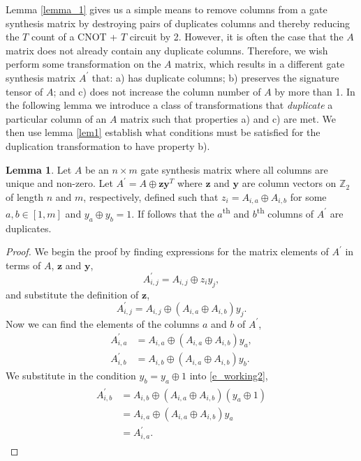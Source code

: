 \documentclass[notitlepage]{article}
\theoremstyle{definition}
\theoremstyle{problem}
\theoremstyle{lemma}
\newtheorem{lemma}{Lemma}[section]
\begin{document}
Lemma \ref{lemma_1} gives us a simple means to remove columns from a gate synthesis matrix by destroying pairs of duplicates columns and thereby reducing the $T$ count of a CNOT + $T$ circuit by 2. However, it is often the case that the $A$ matrix does not already contain any duplicate columns. Therefore, we wish perform some transformation on the $A$ matrix, which results in a different gate synthesis matrix $A^\prime$ that: a) has duplicate columns; b) preserves the signature tensor of $A$; and c) does not increase the column number of $A$ by more than 1. In the following lemma we introduce a class of transformations that \emph{duplicate} a particular column of an $A$ matrix such that properties a) and c) are met. We then use lemma \ref{lem1} establish what conditions must be satisfied for the duplication transformation to have property b).

\theoremstyle{lemma}
\begin{lemma}{}
	\label{lem2}
	Let $A$ be an $n\times m$ gate synthesis matrix where all columns are unique and non-zero. Let $A^\prime = A \oplus \mathbf{z}\mathbf{y}^T$ where $\mathbf{z}$ and $\mathbf{y}$ are column vectors on $\mathbb{Z}_2$ of length $n$ and $m$, respectively, defined such that $z_i = A_{i,a} \oplus A_{i,b}$ for some $a,b\in \left[1,m\right]$ and $y_a \oplus y_b = 1$. If follows that the $a$\textsuperscript{th} and $b$\textsuperscript{th} columns of $A^\prime$ are duplicates.
\end{lemma}
\begin{proof}
	We begin the proof by finding expressions for the matrix elements of $A^\prime$ in terms of $A$, $\mathbf{z}$ and $\mathbf{y}$,
	\begin{equation}
	A^\prime_{i,j} = A_{i,j} \oplus z_i y_j,
	\end{equation}
	and substitute the definition of $\mathbf{z}$,
	\begin{equation}
	A^\prime_{i,j} = A_{i,j} \oplus (A_{i,a}\oplus A_{i,b}) y_j.
	\end{equation}
	Now we can find the elements of the columns $a$ and $b$ of $A^\prime$,
	\begin{align}
	A^\prime_{i,a} &= A_{i,a} \oplus (A_{i,a}\oplus A_{i,b}) y_a,\\
	A^\prime_{i,b} &= A_{i,b} \oplus (A_{i,a}\oplus A_{i,b}) y_b.
	\label{e_working2}
	\end{align}
	We substitute in the condition $y_b = y_a \oplus 1$ into \ref{e_working2},
	\begin{align}
	\begin{split}
	A^\prime_{i,b} &= A_{i,b} \oplus (A_{i,a}\oplus A_{i,b}) (y_a \oplus 1) \\
	&= A_{i,a} \oplus (A_{i,a}\oplus A_{i,b})y_a \\
	& = A^\prime_{i,a}.
	\end{split}			
	\end{align}
\end{proof}
\end{document}
